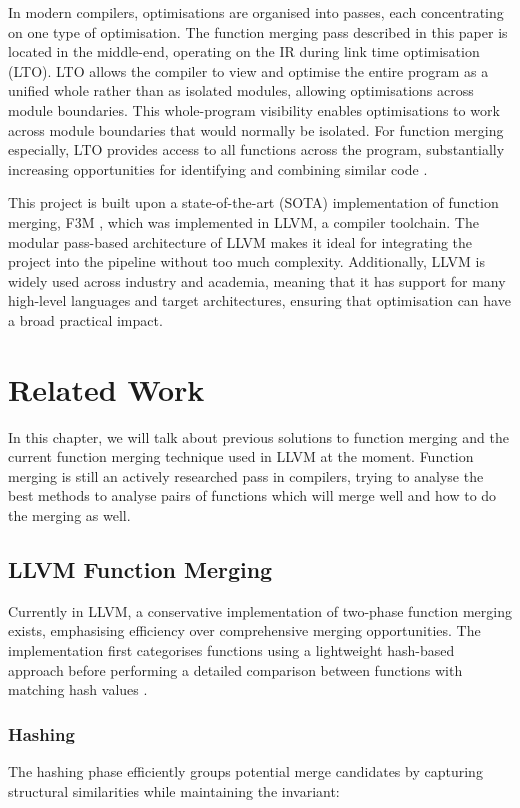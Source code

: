 In modern compilers, optimisations are organised into passes, each concentrating on one type of optimisation. The function merging pass described in this paper is located in the middle-end, operating on the IR during link time optimisation (LTO). LTO allows the compiler to view and optimise the entire program as a unified whole rather than as isolated modules, allowing optimisations across module boundaries. This whole-program visibility enables optimisations to work across module boundaries that would normally be isolated. For function merging especially, LTO provides access to all functions across the program, substantially increasing opportunities for identifying and combining similar code \cite{FunctionMergingSequenceAlignment}. 

This project is built upon a state-of-the-art (SOTA) implementation of function merging, F3M \cite{F3M:FastFocusedFunctionMerging},  which was implemented in LLVM, a compiler toolchain. The modular pass-based architecture of LLVM makes it ideal for integrating the project into the pipeline without too much complexity. Additionally, LLVM is widely used across industry and academia, meaning that it has support for many high-level languages and target architectures, ensuring that optimisation can have a broad practical impact.

\section{Related Work}
In this chapter, we will talk about previous solutions to function merging and the current function merging technique used in LLVM at the moment. Function merging is still an actively researched pass in compilers, trying to analyse the best methods to analyse pairs of functions which will merge well and how to do the merging as well.

\subsection{LLVM Function Merging}
Currently in LLVM, a conservative implementation of two-phase function merging exists, emphasising efficiency over comprehensive merging opportunities. The implementation first categorises functions using a lightweight hash-based approach before performing a detailed comparison between functions with matching hash values \cite{LLVMFuncMergSrc}.

\subsubsection{Hashing}
The hashing phase efficiently groups potential merge candidates by capturing structural similarities while maintaining the invariant:

